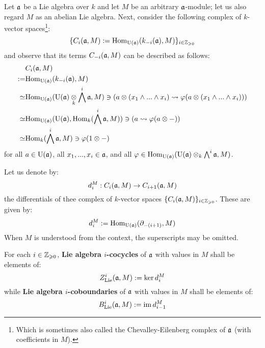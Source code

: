         \begin{remark} \label{remark: simplified_chevalley_eilenberg_complexes}
            Let $\mathfrak{a}$ be a Lie algebra over $k$ and let $M$ be an arbitrary $\mathfrak{a}$-module; let us also regard $M$ as an abelian Lie algebra. Next, consider the following complex of $k$-vector spaces\footnote{Which is sometimes also called the Chevalley-Eilenberg complex of $\mathfrak{a}$ (with coefficients in $M$).}:
                $$\{ C_i(\mathfrak{a}, M) := \mathrm{Hom}_{\mathrm{U}(\mathfrak{a})}(k_{-i}(\mathfrak{a}), M) \}_{i \in \mathbb{Z}_{\geqslant 0}}$$
            and observe that its terms $C_{-i}(\mathfrak{a}, M)$ can be described as follows:
                $$
                    \begin{aligned}
                        & C_i(\a, M)
                        \\
                        := & \Hom_{\rmU(\a)}(k_{-i}(\a), M)
                        \\
                        \cong & \Hom_{\rmU(\a)}( \rmU(\a) \tensor_k \bigwedge^i \a, M ) \ni \left( a \tensor (x_1 \wedge ... \wedge x_i) \mapsto \varphi( a \tensor (x_1 \wedge ... \wedge x_i) ) \right)
                        \\
                        \cong & \Hom_{\rmU(\a)}( \rmU(\a), \Hom_k( \bigwedge^i \a, M ) ) \ni \left( a \mapsto \varphi(a \tensor -) \right)
                        \\
                        \cong & \Hom_k( \bigwedge^i \a, M ) \ni \varphi(1 \tensor -)
                    \end{aligned}
                $$
            for all $a \in \mathrm{U}(\mathfrak{a})$, all $x_1, ..., x_i \in \mathfrak{a}$, and all $\varphi \in \Hom_{\rmU(\a)}( \rmU(\a) \tensor_k \bigwedge^i \a, M )$.
        \end{remark}
        \begin{definition} \label{def: lie_cocycles_and_coboundaries}
            Let us denote by:
                $$d_i^M: C_i(\mathfrak{a}, M) \to C_{i + 1}(\mathfrak{a}, M)$$
            the differentials of thee complex of $k$-vector spaces $\{C_i(\mathfrak{a}, M)\}_{i \in \mathbb{Z}_{\geqslant 0}}$. These are given by:
                $$d_i^M := \mathrm{Hom}_{\mathrm{U}(\mathfrak{a})}(\partial_{-(i + 1)}, M)$$
            When $M$ is understood from the context, the superscripts may be omitted.
        
            For each $i \in \mathbb{Z}_{\geqslant 0}$, \textbf{Lie algebra $i$-cocycles} of $\mathfrak{a}$ with values in $M$ shall be elements of:
                $$Z^i_{\mathrm{Lie}}(\mathfrak{a}, M) := \ker d_i^M$$
            while \textbf{Lie algebra $i$-coboundaries} of $\mathfrak{a}$ with values in $M$ shall be elements of:
                $$B^i_{\mathrm{Lie}}(\mathfrak{a}, M) := \operatorname{im} d_{i - 1}^M$$
        \end{definition}
